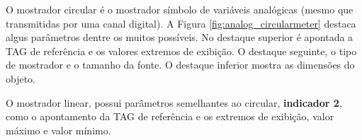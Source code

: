 O mostrador circular é 
o mostrador símbolo de variáveis analógicas
(mesmo que transmitidas por uma canal digital). 
A Figura \ref{fig:analog_circularmeter} 
destaca algus parâmetros dentre os muitos possíveis. 
No destaque superior é apontada a TAG de referência e 
os valores extremos de exibição. 
O destaque seguinte, 
o tipo de mostrador e o tamanho da fonte. 
O destaque inferior mostra as dimensões do objeto. 




\begin{figure}[ht!]
	\centering
\end{figure}




O mostrador linear, 
possui parâmetros semelhantes ao circular,
\textbf{indicador 2},
como o apontamento da TAG de referência e os extremos de exibição,
valor máximo e valor mínimo. 


\begin{figure}[ht!]
	\centering
\end{figure}


